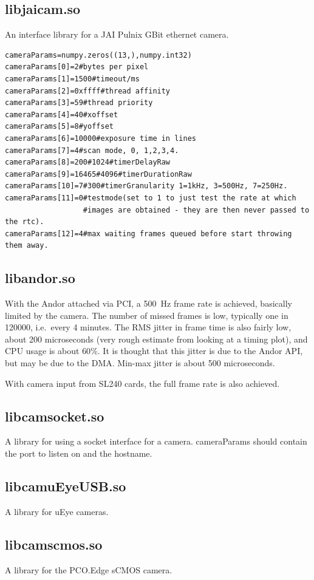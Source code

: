 \documentclass[a4,10pt]{article}
\begin{document}
\subsection{libjaicam.so}
An interface library for a JAI Pulnix GBit ethernet camera.
\begin{verbatim}
cameraParams=numpy.zeros((13,),numpy.int32)
cameraParams[0]=2#bytes per pixel
cameraParams[1]=1500#timeout/ms
cameraParams[2]=0xffff#thread affinity
cameraParams[3]=59#thread priority
cameraParams[4]=40#xoffset
cameraParams[5]=8#yoffset
cameraParams[6]=10000#exposure time in lines
cameraParams[7]=4#scan mode, 0, 1,2,3,4.
cameraParams[8]=200#1024#timerDelayRaw
cameraParams[9]=16465#4096#timerDurationRaw
cameraParams[10]=7#300#timerGranularity 1=1kHz, 3=500Hz, 7=250Hz.
cameraParams[11]=0#testmode(set to 1 to just test the rate at which
                  #images are obtained - they are then never passed to the rtc).
cameraParams[12]=4#max waiting frames queued before start throwing them away.
\end{verbatim}

\subsection{libandor.so}
With the Andor attached via PCI, a 500~Hz frame rate is achieved,
basically limited by the camera.  The number of missed frames is low,
typically one in 120000, i.e.\ every 4 minutes.  The RMS jitter in
frame time is also fairly low, about 200 microseconds (very rough
estimate from looking at a timing plot), and CPU usage is about
$60\%$.  It is thought that this jitter is due to the Andor API, but
may be due to the DMA.  Min-max jitter is about 500 microseconds.  

With camera input from SL240 cards, the full frame rate is also achieved.

\subsection{libcamsocket.so}
A library for using a socket interface for a camera.  cameraParams
should contain the port to listen on and the hostname.

\subsection{libcamuEyeUSB.so}
A library for uEye cameras.

\subsection{libcamscmos.so}
A library for the PCO.Edge sCMOS camera.
\end{document}

